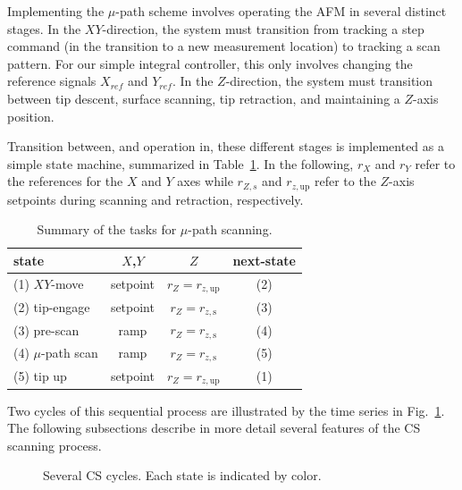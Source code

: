 \documentclass[twocolumn,oneside]{IEEEtran/IEEEtran}
\newcommand{\rzup}{\ensuremath{r_{z,\textrm{up}}}\xspace}
\newcommand{\rzs}{\ensuremath{r_{z,\textrm{s}}}\xspace}
\begin{document}
Implementing the $\mu$-path scheme involves operating the AFM in several
distinct stages. In the $XY$-direction, the system must transition from tracking
a step command (in the transition to a new measurement location) to tracking a
scan pattern. For our simple integral controller, this only involves changing
the reference signals $X_{ref}$ and $Y_{ref}$.
In the $Z$-direction, the system
must transition between tip descent, surface scanning, tip retraction, and
maintaining a $Z$-axis position.

	
Transition between, and operation in, these different stages is implemented as a
simple state machine, summarized in Table~\ref{tab:cs_tasks}. 
In the following, $r_X$ and $r_Y$ refer to the references for the $X$ and $Y$ axes while $r_{Z,s}$ and $\rzup$ refer to the $Z$-axis setpoints during scanning and retraction, respectively.

\begin{table}
  \centering
  \caption{Summary of the tasks for $\mu$-path scanning.}
  \begin{tabular}{lccc}
    state & $X$,$Y$ & $Z$ & next-state\\
    \toprule
    (1) $XY$-move & setpoint & $r_Z = \rzup$ & (2)\\
    (2) tip-engage & setpoint & $r_Z = \rzs$ & (3)\\
    (3) pre-scan & ramp & $r_Z = \rzs$ & (4)\\
    (4) $\mu$-path scan & ramp & $r_Z = \rzs$ & (5)\\
    (5) tip up & setpoint & $r_Z = \rzup$ & (1)\\
  \end{tabular}
  \label{tab:cs_tasks}
\end{table}
Two cycles of this sequential process are illustrated by the time series in
Fig.~\ref{fig:mupathsignaltrajectory}. The following subsections describe in
more detail several features of the CS scanning process.
  
\begin{figure}[t!]
  \centering
  
  \caption{Several CS cycles. Each state is indicated by color.}
  \label{fig:mupathsignaltrajectory}
\end{figure}
\end{document}
